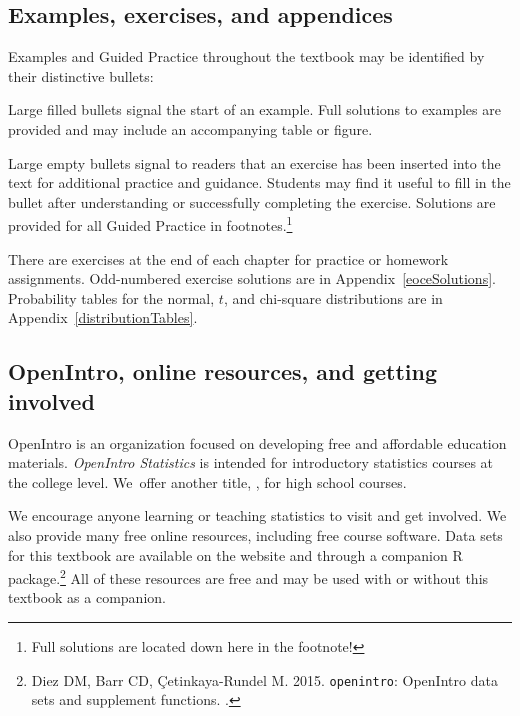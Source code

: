 \subsection*{Examples, exercises, and appendices}

Examples and Guided Practice throughout the textbook may be identified by their distinctive bullets:

\begin{example}{Large filled bullets signal the start of an example.}
Full solutions to examples are provided and may include an accompanying table or figure.
 \end{example}

\begin{exercise}
Large empty bullets signal to readers that an exercise has been inserted into the text for additional practice and guidance. Students may find it useful to fill in the bullet after understanding or successfully completing the exercise. Solutions are provided for all Guided Practice in footnotes.\footnote{Full solutions are located down here in the footnote!}
\end{exercise}

There are exercises at the end of each chapter for practice or homework assignments. Odd-numbered exercise solutions are in Appendix~\ref{eoceSolutions}. Probability tables for the normal, $t$, and chi-square distributions are in Appendix~\ref{distributionTables}.

\subsection*{OpenIntro, online resources, and getting involved}

OpenIntro is an organization focused on developing free and affordable education materials. \emph{OpenIntro Statistics} is intended for introductory statistics courses at the college level. We~offer another title, , for high school courses.

We encourage anyone learning or teaching statistics to visit  and get involved. We also provide many free online resources, including free course software. Data sets for this textbook are available on the website and through a companion R package.\footnote{Diez DM, Barr CD, \c{C}etinkaya-Rundel M. 2015. \texttt{openintro}: OpenIntro data sets and supplement functions. .} All of these resources are free and may be used with or without this textbook as a companion.


